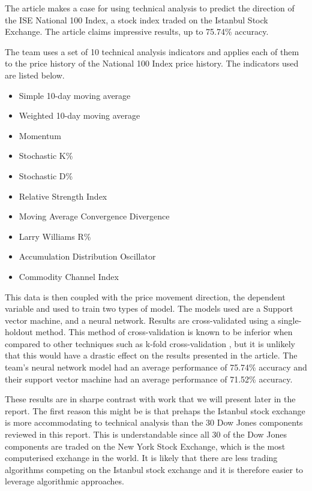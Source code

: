 \documentclass{report}
\begin{document}
The article makes a case for using technical analysis to predict the direction of the ISE National 100 Index, a stock index traded on the Istanbul Stock Exchange. The article claims impressive results, up to 75.74\% accuracy.

The team uses a set of 10 technical analysis indicators and applies each of them to the price history of the National 100 Index price history. The indicators used are listed below.

\begin{itemize}[noitemsep]
  \item Simple 10-day moving average
  \item Weighted 10-day moving average
  \item Momentum
  \item Stochastic K\%
  \item Stochastic D\%
  \item Relative Strength Index
  \item Moving Average Convergence Divergence
  \item Larry Williams R\%
  \item Accumulation Distribution Oscillator
  \item Commodity Channel Index
\end{itemize}

This data is then coupled with the price movement direction, the dependent variable and used to train two types of model. The models used are a Support vector machine, and a neural network. Results are cross-validated using a single-holdout method. This method of cross-validation is known to be inferior when compared to other techniques such as k-fold cross-validation \cite{kohavi1995study}, but it is unlikely that this would have a drastic effect on the results presented in the article. The team's neural network model had an average performance of 75.74\% accuracy and their support vector machine had an average performance of 71.52\% accuracy.

These results are in sharpe contrast with work that we will present later in the report. The first reason this might be is that prehaps the Istanbul stock exchange is more accommodating to technical analysis than the 30 Dow Jones components reviewed in this report. This is understandable since all 30 of the Dow Jones components are traded on the New York Stock Exchange, which is the most computerised exchange in the world. It is likely that there are less trading algorithms competing on the Istanbul stock exchange and it is therefore easier to leverage algorithmic approaches. 
\end{document}
